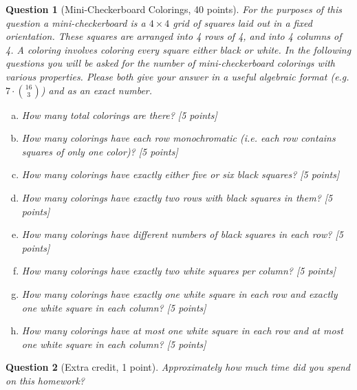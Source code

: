 \documentclass{article}
\newtheorem{ques}{Question}
\begin{document}
\begin{ques}[Mini-Checkerboard Colorings, 40 points]
For the purposes of this question a mini-checkerboard is a $4\times 4$ grid of squares laid out in a fixed orientation. These squares are arranged into 4 rows of 4, and into 4 columns of 4. A coloring involves coloring every square either black or white. In the following questions you will be asked for the number of mini-checkerboard colorings with various properties. Please both give your answer in a useful algebraic format (e.g. $7\cdot \binom{16}{3}$) and as an exact number.
\begin{enumerate}[(a)]
\item How many total colorings are there? [5 points]
\item How many colorings have each row monochromatic (i.e. each row contains squares of only one color)? [5 points]
\item How many colorings have exactly either five or six black squares? [5 points]
\item How many colorings have exactly two rows with black squares in them? [5 points]
\item How many colorings have different numbers of black squares in each row? [5 points]
\item How many colorings have exactly two white squares per column? [5 points]
\item How many colorings have exactly one white square in each row and exactly one white square in each column? [5 points]
\item How many colorings have at most one white square in each row and at most one white square in each column? [5 points]
\end{enumerate}
\end{ques}

\begin{ques}[Extra credit, 1 point]
Approximately how much time did you spend on this homework?
\end{ques}
\end{document}
